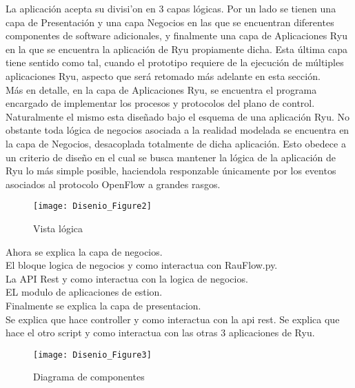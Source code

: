La aplicaci\'on acepta su divisi'on en 3 capas l\'ogicas. Por un lado se tienen una capa de Presentaci\'on y una capa Negocios en las que se encuentran diferentes componentes de software adicionales, y finalmente una capa de Aplicaciones Ryu en la que se encuentra la aplicaci\'on de Ryu propiamente dicha. Esta \'ultima capa tiene sentido como tal, cuando el prototipo requiere de la ejecuci\'on de m\'ultiples aplicaciones Ryu, aspecto que ser\'a retomado m\'as adelante en esta secci\'on.\\

M\'as en detalle, en la capa de Aplicaciones Ryu, se encuentra el programa encargado de implementar los procesos y protocolos del plano de control. Naturalmente el mismo esta dise\~nado bajo el esquema de una aplicaci\'on Ryu. No obstante toda l\'ogica de negocios asociada a la realidad modelada se encuentra en la capa de Negocios, desacoplada totalmente de dicha aplicaci\'on. Esto obedece a un criterio de dise\~no en el cual se busca mantener la l\'ogica de la aplicaci\'on de Ryu lo m\'as simple posible, haciendola responzable \'unicamente por los eventos asociados al protocolo OpenFlow a grandes rasgos. 

\begin{figure}[ht!] 
\centering    
\texttt{[image: Disenio\_Figure2]}
\caption[Vista l\'ogica]{Vista l\'ogica}
\label{fig:VistaComponentes1}
\end{figure}


Ahora se explica la capa de negocios.\\

El bloque logica de negocios y como interactua con RauFlow.py.\\

La API Rest y como interactua con la logica de negocios.\\

EL modulo de aplicaciones de estion.\\


Finalmente se explica la capa de presentacion.\\

Se explica que hace controller y como interactua con la api rest. Se explica que hace el otro script y como interactua con las otras 3 aplicaciones de Ryu.\\

\begin{figure}[ht!] 
\centering    
\texttt{[image: Disenio\_Figure3]}
\caption[Diagrama de componentes]{Diagrama de componentes}
\label{fig:ModeloDeDominio}
\end{figure}

